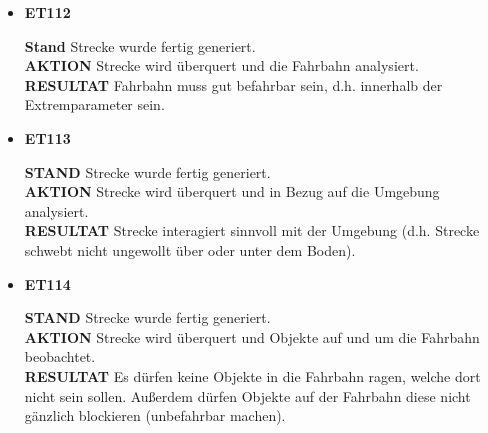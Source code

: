 \documentclass[parskip=full]{scrartcl}
\begin{document}
\begin{itemize} [label={}]
		\pagebreak
		\item \textbf{ET112}\par
			\textbf{Stand} Strecke wurde fertig generiert.\\
			\textbf{AKTION} Strecke wird überquert und die Fahrbahn analysiert.\\
			\textbf{RESULTAT} Fahrbahn muss gut befahrbar sein, d.h. innerhalb der Extremparameter sein.\\\par
			
		\item \textbf{ET113}\par
			\textbf{STAND} Strecke wurde fertig generiert.\\
			\textbf{AKTION} Strecke wird überquert und in Bezug auf die Umgebung analysiert.\\
			\textbf{RESULTAT} Strecke interagiert sinnvoll mit der Umgebung (d.h. Strecke schwebt nicht ungewollt über oder unter dem Boden).\\\par
			
		\item \textbf{ET114}\par
			\textbf{STAND} Strecke wurde fertig generiert.\\ 
			\textbf{AKTION} Strecke wird überquert und Objekte auf und um die Fahrbahn beobachtet.\\
			\textbf{RESULTAT} Es dürfen keine Objekte in die Fahrbahn ragen, welche dort nicht sein sollen. Außerdem dürfen Objekte auf der Fahrbahn diese nicht gänzlich blockieren (unbefahrbar machen).\\\par
			
		
	\end{itemize}
\end{document}
